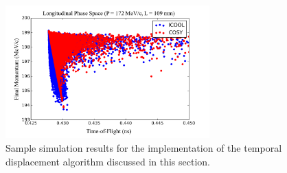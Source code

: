 \begin{figure}[H]
  \centering
    \includegraphics[width=0.7\textwidth]{Figures/longitudinal_phase_space} 
  \caption{Sample simulation results for the implementation of the temporal displacement algorithm discussed in this section.}
  \label{fig:longitudinal_phase_space}
\end{figure}

